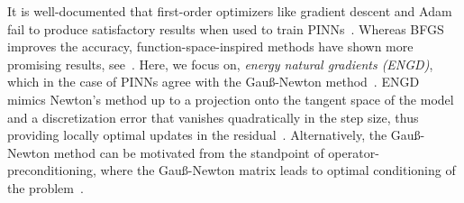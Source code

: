 It is well-documented that first-order optimizers like gradient descent and Adam fail to produce satisfactory results when used to train PINNs~\cite{?}. 
Whereas BFGS improves the accuracy, function-space-inspired methods have shown more promising results, see~\cite{?}.
Here, we focus on, \emph{energy natural gradients (ENGD)}, which in the case of PINNs agree with the Gauß-Newton method~\citep{muller2023achieving}. 
ENGD mimics Newton's method up to a projection onto the tangent space of the model and a discretization error that vanishes quadratically in the step size, thus providing locally optimal updates in the residual~\citep{muller2023achieving}. Alternatively, the Gauß-Newton method can be motivated from the standpoint of operator-preconditioning, where the Gauß-Newton matrix leads to optimal conditioning of the problem~\citep{de2023operator}. 

